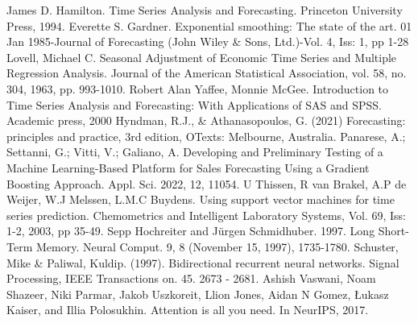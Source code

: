 \documentclass[diploma]{nanolab2015}
\begin{document}
\newpage
\begin{thebibliography}{00}
    James D. Hamilton. Time Series Analysis and Forecasting. Princeton University Press, 1994.
    Everette S. Gardner. Exponential smoothing: The state of the art. 01 Jan 1985-Journal of Forecasting (John Wiley \& Sons, Ltd.)-Vol. 4, Iss: 1, pp 1-28
    Lovell, Michael C. Seasonal Adjustment of Economic Time Series and Multiple Regression Analysis. Journal of the American Statistical Association, vol. 58, no. 304, 1963, pp. 993-1010.
    Robert Alan Yaffee, Monnie McGee. Introduction to Time Series Analysis and Forecasting: With Applications of SAS and SPSS. Academic press, 2000
    Hyndman, R.J., \& Athanasopoulos, G. (2021) Forecasting: principles and practice, 3rd edition, OTexts: Melbourne, Australia.
    Panarese, A.; Settanni, G.; Vitti, V.; Galiano, A. Developing and Preliminary Testing of a Machine Learning-Based Platform for Sales Forecasting Using a Gradient Boosting Approach. Appl. Sci. 2022, 12, 11054.
    U Thissen, R van Brakel, A.P de Weijer, W.J Melssen, L.M.C Buydens. Using support vector machines for time series prediction. Chemometrics and Intelligent Laboratory Systems, Vol. 69, Iss: 1-2, 2003, pp 35-49.
    Sepp Hochreiter and Jürgen Schmidhuber. 1997. Long Short-Term Memory. Neural Comput. 9, 8 (November 15, 1997), 1735-1780.
    Schuster, Mike \& Paliwal, Kuldip. (1997). Bidirectional recurrent neural networks. Signal Processing, IEEE Transactions on. 45. 2673 - 2681.
    Ashish Vaswani, Noam Shazeer, Niki Parmar, Jakob Uszkoreit, Llion Jones, Aidan N Gomez, Łukasz Kaiser, and Illia Polosukhin. Attention is all you need. In NeurIPS, 2017.
\end{thebibliography}
\end{document}
